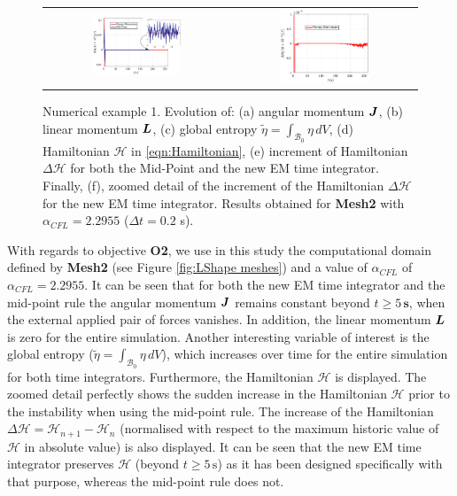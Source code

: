 \begin{figure}[hbtp]
\begin{tabular}{cc}
%
	\includegraphics[width=0.5\textwidth]{Figures/Example1/EnergyBalancePlots/DHFinalv2.eps} &
\includegraphics[width=0.5\textwidth]{Figures/Example1/EnergyBalancePlots/DHEMv2.eps}\\
%		
	\end{tabular}
	\caption{Numerical example 1. Evolution of: (a) angular momentum $\boldsymbol{J}$, (b) linear momentum $\boldsymbol{L}$, (c) global entropy $\tilde{\eta}=\int_{\mathcal{B}_0}\eta\,dV$, (d) Hamiltonian $\mathcal{H}$  in \eqref{eqn:Hamiltonian}, (e) increment of Hamiltonian $\Delta\mathcal{H}$ for both the Mid-Point and the new EM time integrator.  Finally, (f), zoomed detail of the increment of the Hamiltonian  $\Delta\mathcal{H}$ for the new EM time integrator. Results obtained for \textbf{Mesh2} with $\alpha_{CFL}=2.2955$ ($\Delta t=0.2$ s).}
	\label{fig:example 1 energy balance}
\end{figure}


With regards to objective \textbf{O2}, we use in this study the computational domain defined by \textbf{Mesh2} (see Figure \ref{fig:LShape meshes}) and a value of $\alpha_{CFL}$ of $\alpha_{CFL}=2.2955$. It can be seen that for both the new EM time integrator and the mid-point rule the angular momentum $\boldsymbol{J}$ remains constant beyond $t\geq 5\,\textbf{s}$, when the external applied pair of forces vanishes. In addition, the linear momentum $\boldsymbol{L}$ is zero for the entire simulation. Another interesting variable of interest is the global entropy ($\tilde{\eta}=\int_{\mathcal{B}_0}\eta\,dV$), which increases over time for the entire simulation for both time integrators. Furthermore, the Hamiltonian $\mathcal{H}$ is displayed. The zoomed detail perfectly shows the sudden increase in the Hamiltonian $\mathcal{H}$ prior to the instability when using the mid-point rule. The increase of the Hamiltonian $\Delta \mathcal{H}={\mathcal{H}_{n+1}-\mathcal{H}_n}$ (normalised with respect to the maximum historic value of $\mathcal{H}$ in absolute value) is also displayed. It can be seen that the new EM time integrator preserves $\mathcal{H}$ (beyond $t\geq 5\,\text{s}$) as it has been designed specifically with that purpose, whereas the mid-point rule does not. 

